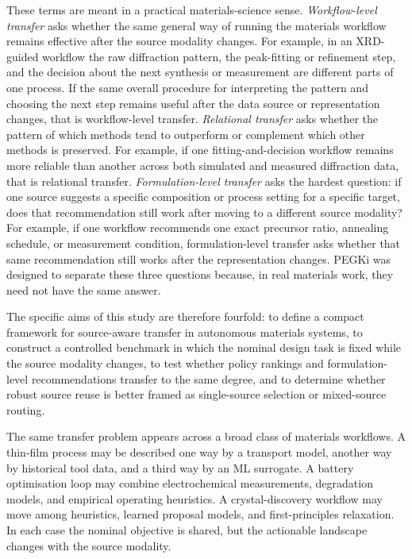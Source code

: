 \documentclass[twoside,twocolumn,9pt]{article}
\begin{document}
These terms are meant in a practical materials-science sense. \emph{Workflow-level transfer} asks whether the same general way of running the materials workflow remains effective after the source modality changes. For example, in an XRD-guided workflow the raw diffraction pattern, the peak-fitting or refinement step, and the decision about the next synthesis or measurement are different parts of one process. If the same overall procedure for interpreting the pattern and choosing the next step remains useful after the data source or representation changes, that is workflow-level transfer. \emph{Relational transfer} asks whether the pattern of which methods tend to outperform or complement which other methods is preserved. For example, if one fitting-and-decision workflow remains more reliable than another across both simulated and measured diffraction data, that is relational transfer. \emph{Formulation-level transfer} asks the hardest question: if one source suggests a specific composition or process setting for a specific target, does that recommendation still work after moving to a different source modality? For example, if one workflow recommends one exact precursor ratio, annealing schedule, or measurement condition, formulation-level transfer asks whether that same recommendation still works after the representation changes. PEGKi was designed to separate these three questions because, in real materials work, they need not have the same answer.

The specific aims of this study are therefore fourfold: to define a compact framework for source-aware transfer in autonomous materials systems, to construct a controlled benchmark in which the nominal design task is fixed while the source modality changes, to test whether policy rankings and formulation-level recommendations transfer to the same degree, and to determine whether robust source reuse is better framed as single-source selection or mixed-source routing.

The same transfer problem appears across a broad class of materials workflows. A thin-film process may be described one way by a transport model, another way by historical tool data, and a third way by an ML surrogate. A battery optimisation loop may combine electrochemical measurements, degradation models, and empirical operating heuristics. A crystal-discovery workflow may move among heuristics, learned proposal models, and first-principles relaxation. In each case the nominal objective is shared, but the actionable landscape changes with the source modality.\cite{Gongora2021SimulationTransfer,Yoshida2025NetworkedAutonomous,Collins2025FUSE}
\end{document}
